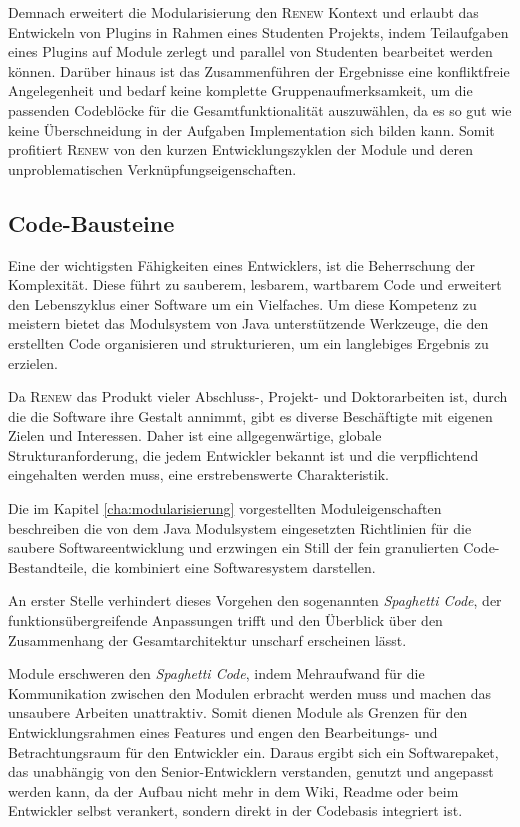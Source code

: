 	Demnach erweitert die Modularisierung den \textsc{Renew} Kontext und erlaubt das Entwickeln von Plugins in Rahmen eines Studenten Projekts, indem Teilaufgaben eines Plugins auf Module zerlegt und parallel von Studenten bearbeitet werden können. Darüber hinaus ist das Zusammenführen der Ergebnisse eine konfliktfreie Angelegenheit und bedarf keine komplette Gruppenaufmerksamkeit, um die passenden Codeblöcke für die Gesamtfunktionalität auszuwählen, da es so gut wie keine Überschneidung in der Aufgaben Implementation sich bilden kann. Somit profitiert \textsc{Renew} von den kurzen Entwicklungszyklen der Module und deren unproblematischen Verknüpfungseigenschaften. 

\subsection{Code-Bausteine}\label{sub:cbs}
	Eine der wichtigsten Fähigkeiten eines Entwicklers, ist die Beherrschung der Komplexität. Diese führt zu sauberem, lesbarem, wartbarem Code und erweitert den Lebenszyklus einer Software um ein Vielfaches. Um diese Kompetenz zu meistern bietet das Modulsystem von Java unterstützende Werkzeuge, die den erstellten Code organisieren und strukturieren, um ein langlebiges Ergebnis zu erzielen.  \newline

	Da \textsc{Renew} das Produkt vieler Abschluss-, Projekt- und Doktorarbeiten ist, durch die die Software ihre Gestalt annimmt, gibt es diverse Beschäftigte mit eigenen Zielen und Interessen. Daher ist eine allgegenwärtige, globale Strukturanforderung, die jedem Entwickler bekannt ist und die verpflichtend eingehalten werden muss, eine erstrebenswerte Charakteristik.  \newline

	Die im Kapitel \ref{cha:modularisierung} vorgestellten Moduleigenschaften beschreiben die von dem Java Modulsystem eingesetzten Richtlinien für die saubere Softwareentwicklung und erzwingen ein Still der fein granulierten Code-Bestandteile, die kombiniert eine Softwaresystem darstellen. \newline

	An erster Stelle verhindert dieses Vorgehen den sogenannten \textit{Spaghetti Code}, der funktionsübergreifende Anpassungen trifft und den Überblick über den Zusammenhang der Gesamtarchitektur unscharf erscheinen lässt.  \newline

	Module erschweren den \textit{Spaghetti Code}, indem Mehraufwand für die Kommunikation zwischen den Modulen erbracht werden muss und machen das unsaubere Arbeiten unattraktiv. Somit dienen Module als Grenzen für den Entwicklungsrahmen eines Features und engen den Bearbeitungs- und Betrachtungsraum für den Entwickler ein. Daraus ergibt sich ein Softwarepaket, das unabhängig von den Senior-Entwicklern verstanden, genutzt und angepasst werden kann, da der Aufbau nicht mehr in dem Wiki, Readme oder beim Entwickler selbst verankert, sondern direkt in der Codebasis integriert ist.  \newline

